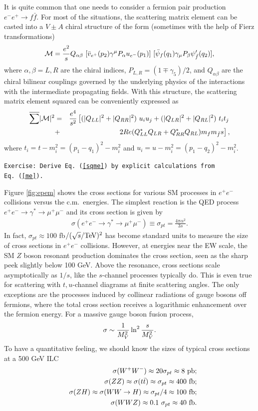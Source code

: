 \documentclass[12pt,prd,aps,floats,preprintnumbers,preprint,superscriptaddress,floatfix,nofootinbib]{revtex4}
\def\cM{{\cal M}}
\def\epem{e^+e^-}
\def\pb{{\rm pb}}
\def\fb{{\rm fb}}
\def\be{\begin{equation}}
\def\ee{\end{equation}}
\def\bea{\begin{eqnarray}}
\def\eea{\end{eqnarray}}
\begin{document}
It is quite common that one needs to consider a fermion pair production
$e^-e^+\to f\bar f$. For most of the situations, the scattering matrix element
can be casted into a $V\pm A$ chiral structure of the form (sometimes with
the help of Fierz transformations)
\bea
\cM = {e^2 \over s} Q_{\alpha\beta}\ 
[\bar v_{e^+}(p_2) \gamma^\mu P_\alpha u_{e^-}(p_1)]\ 
   [\bar \psi_f(q_1) \gamma_\mu P_\beta \psi'_{\bar f}(q_2)],
\label{me}
\eea
where $\alpha, \beta=L, R$ are the  chiral indices, $P_{L,R}^{}=(1\mp \gamma_5)/2$, 
and $Q_{\alpha\beta}$ are the chiral bilinear couplings governed by the underlying
physics of the interactions with the intermediate propagating fields. With this
structure, the  scattering matrix element squared can be conveniently
expressed as
\bea 
\nonumber
\overline{ \sum} |\cM|^2 &=& {e^4 \over s^2} \left[
( |Q_{LL}|^2 + |Q_{RR}|^2 )\ u_i u_j +
( |Q_{LR}|^2 + |Q_{RL}|^2 )\ t_i t_j  \right.  \\
&+& \left. 2Re ( Q_{LL}^* Q_{LR} + Q_{RR}^*Q_{RL} ) m_f m_{\bar f} s \right],
\label{sqme}
\eea
where $t_i=t-m_i^2=(p_1-q_1)^2-m_i^2$ and $u_i=u-m_i^2=(p_1-q_2)^2-m_i^2$.

{
\vskip 0.2cm
\noindent
\tt Exercise: Derive Eq.~(\ref{sqme}) by explicit calculations
from Eq.~(\ref{me}).
\vskip 0.2cm
}

Figure \ref{fig:epem} shows the cross sections for various SM processes
in $\epem$ collisions versus the c.m.~energies. 
The simplest reaction  is the QED process 
$e^+e^-\to\gamma^*\to \mu^+\mu^-$ and its cross section is given by
\bea
{\sigma(e^+e^-\to \gamma^*\to \mu^+\mu^-)\equiv \sigma_{pt}= \frac{4\pi\alpha^2}{3 s}  }.
\eea
In fact, $\sigma_{pt}\approx 100$ fb$/(\sqrt s/{\rm TeV})^2$ 
has become  standard units to measure the size of cross sections
in $e^+e^-$ collisions. However, at energies near the EW scale,  the SM $Z$ boson resonant
production dominates the cross section, seen  as the sharp peek 
slightly below 100 GeV. Above
the resonance, cross sections scale asymptotically as $1/s$, like the 
$s$-channel processes typically do. This is even true for scattering 
with $t,u$-channel diagrams at finite scattering angles. 
The only exceptions are the processes induced by collinear radiations of gauge
bosons off fermions, 
where the total cross section receives a logarithmic enhancement over the 
fermion energy.  For a massive gauge boson fusion process,
\be
\sigma \sim {1\over M^2_V}\ln^2{s\over M_V^2}.
\ee
To have a quantitative feeling, we should know the sizes of typical cross sections
at a 500 GeV ILC
\bea
\nonumber
&&\sigma(W^+W^-) \approx 20\sigma_{pt} \approx 8\ \pb;\\
\nonumber
&&\sigma(ZZ) \approx \sigma(t\bar t) \approx \sigma_{pt} \approx 400\ \fb;\\
\nonumber
&&\sigma(ZH) \approx \sigma(WW\to H) \approx \sigma_{pt}/4 \approx 100\ \fb;\\
\nonumber
&& \sigma(WWZ) \approx 0.1\ \sigma_{pt} \approx 40\ \fb.
\eea
\end{document}
